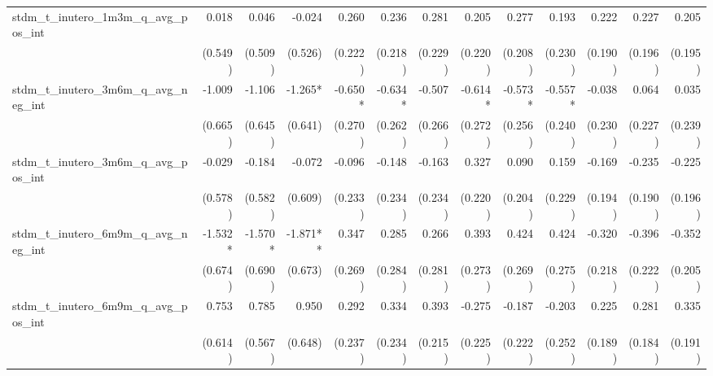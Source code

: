 \begin{tabular}{lrrrrrrrrrrrr}
stdm\_t\_inutero\_1m3m\_q\_avg\_pos\_int    &        0.018 &        0.046 &       -0.024 &        0.260 &        0.236 &        0.281 &        0.205 &        0.277 &        0.193 &        0.222 &        0.227 &        0.205 \\ 
                                            &      (0.549) &      (0.509) &      (0.526) &      (0.222) &      (0.218) &      (0.229) &      (0.220) &      (0.208) &      (0.230) &      (0.190) &      (0.196) &      (0.195) \\ 
stdm\_t\_inutero\_3m6m\_q\_avg\_neg\_int    &       -1.009 &       -1.106 &      -1.265* &      -0.650* &      -0.634* &       -0.507 &      -0.614* &      -0.573* &      -0.557* &       -0.038 &        0.064 &        0.035 \\ 
                                            &      (0.665) &      (0.645) &      (0.641) &      (0.270) &      (0.262) &      (0.266) &      (0.272) &      (0.256) &      (0.240) &      (0.230) &      (0.227) &      (0.239) \\ 
stdm\_t\_inutero\_3m6m\_q\_avg\_pos\_int    &       -0.029 &       -0.184 &       -0.072 &       -0.096 &       -0.148 &       -0.163 &        0.327 &        0.090 &        0.159 &       -0.169 &       -0.235 &       -0.225 \\ 
                                            &      (0.578) &      (0.582) &      (0.609) &      (0.233) &      (0.234) &      (0.234) &      (0.220) &      (0.204) &      (0.229) &      (0.194) &      (0.190) &      (0.196) \\ 
stdm\_t\_inutero\_6m9m\_q\_avg\_neg\_int    &      -1.532* &      -1.570* &     -1.871** &        0.347 &        0.285 &        0.266 &        0.393 &        0.424 &        0.424 &       -0.320 &       -0.396 &       -0.352 \\ 
                                            &      (0.674) &      (0.690) &      (0.673) &      (0.269) &      (0.284) &      (0.281) &      (0.273) &      (0.269) &      (0.275) &      (0.218) &      (0.222) &      (0.205) \\ 
stdm\_t\_inutero\_6m9m\_q\_avg\_pos\_int    &        0.753 &        0.785 &        0.950 &        0.292 &        0.334 &        0.393 &       -0.275 &       -0.187 &       -0.203 &        0.225 &        0.281 &        0.335 \\ 
                                            &      (0.614) &      (0.567) &      (0.648) &      (0.237) &      (0.234) &      (0.215) &      (0.225) &      (0.222) &      (0.252) &      (0.189) &      (0.184) &      (0.191) \\ 

\end{tabular}
